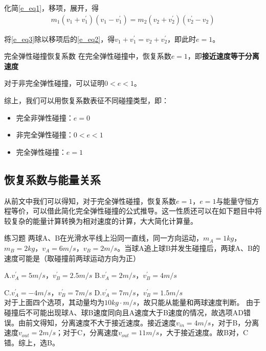 化简\eqref{e_eq1}，移项，展开，得
\begin{subequations}
\begin{align}
\label{e_eq3}
m_1 (v_1 + v_1^{\prime})(v_1 - v_1^{\prime}) = m_2 (v_2 + v_2^{\prime})(v_2^{\prime} - v_2)  
\end{align}
\end{subequations}

将\eqref{e_eq3}除以移项后的\eqref{e_eq2}，得$v_1 + v_1^{\prime} = v_2 + v_2^{\prime}$，即此时$e=1$。

\begin{theo}{完全弹性碰撞恢复系数}{}
在完全弹性碰撞中，恢复系数$e=1$，即\textbf{接近速度等于分离速度}
\end{theo}

对于非完全弹性碰撞，可以证明$0 < e <1$。

综上，我们可以用恢复系数表征不同碰撞类型，即：

\begin{itemize}
	\item 完全非弹性碰撞：$e = 0$
	\item 非完全弹性碰撞：$0 < e < 1$
	\item 完全弹性碰撞：$e = 1$
\end{itemize}

\subsection{恢复系数与能量关系}

从前文中我们可以得知，对于完全弹性碰撞，恢复系数$e=1$，$e=1$与能量守恒方程等价，可以借此简化完全弹性碰撞的公式推导。这一性质还可以在如下题目中将较复杂的能量计算转换为相对速度的计算，大大简化计算量。

\begin{ep}{练习题}{}
两球A、B在光滑水平线上沿同一直线，同一方向运动，$m_A = 1kg$，$m_B = 2kg$，$v_A = 6m/s$，$v_B = 2m/s$。当球A追上球B并发生碰撞后，两球A、B的速度可能是（取碰撞前两球运动方向为正）

A.$v_A^{\prime} = 5m/s$，$v_B^{\prime} = 2.5m/s$ \quad B.$v_A^{\prime} = 2m/s$，$v_B^{\prime} = 4m/s$

C.$v_A^{\prime} = -4m/s$，$v_B^{\prime} = 7m/s$ \quad D.$v_A^{\prime} = 7m/s$，$v_B^{\prime} = 1.5m/s$
~\\

对于上面四个选项，其动量均为$10kg \cdot m/s$，故只能从能量和两球速度判断。
由于碰撞后不可能出现球A、球B速度同向且A速度大于B速度的情况，故选项AD错误。由前文得知，分离速度不大于接近速度。接近速度$v_{in}=4m/s$，对于B，分离速度$v_{out} = 2m/s$；对于C，分离速度$v_{out} = 11m/s$，大于接近速度。故B对，C错。综上，选B。
\end{ep}


